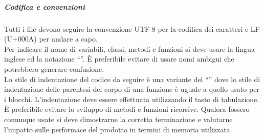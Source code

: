 \documentclass[../NormeDiProgetto.tex]{subfiles}
\begin{document}
				\subparagraph{Codifica e convenzioni\\}
					Tutti i file devono seguire la convenzione UTF-8 per la codifica dei caratteri e
					LF (U+000A) per andare a capo.\\
					Per indicare il nome di variabili, classi, metodi e funzioni si deve usare la lingua
					inglese ed la notazione ``''. È preferibile evitare di usare nomi ambigui che
					potrebbero generare confusione.\\
					Lo stile di indentazione del codice da seguire è una variante del ``'' dove lo stile
					di indentazione delle parentesi del corpo di una funzione è uguale a quello usato per
					i blocchi. L'indentazione deve essere effettuata utilizzando il tasto di tabulazione.\\
					È preferibile evitare lo sviluppo di metodi e funzioni ricorsive. Qualora fossero
					comunque usate si deve dimostrarne la corretta terminazione e valutarne l'impatto sulle
					performace del prodotto in termini di memoria utilizzata.\\
\end{document}
